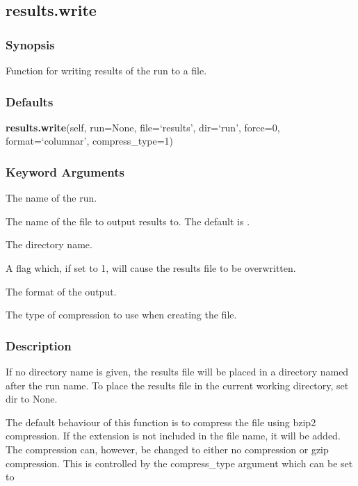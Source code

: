   

 \newpage 

 \subsection{results.write} 

  
 \subsubsection{Synopsis} 

 Function for writing results of the run to a file. 
  

  
 \subsubsection{Defaults} 

 \textsf{\textbf{results.write}(self, run=None, file=`results', dir=`run', force=0, format=`columnar', compress\_type=1)} 

  
 \subsubsection{Keyword Arguments} 

   The name of the run.   

   The name of the file to output results to.  The default is .   

   The directory name.   

   A flag which, if set to 1, will cause the results file to be overwritten.   

   The format of the output.   

   The type of compression to use when creating the file.  

  

  
 \subsubsection{Description} 

 If no directory name is given, the results file will be placed in a directory named after the run name.  To place the results file in the current working directory, set dir to None. 
  

 The default behaviour of this function is to compress the file using bzip2 compression.  If the extension  is not included in the file name, it will be added.  The compression can, however, be changed to either no compression or gzip compression.  This is controlled by the compress\_type argument which can be set to 
  

